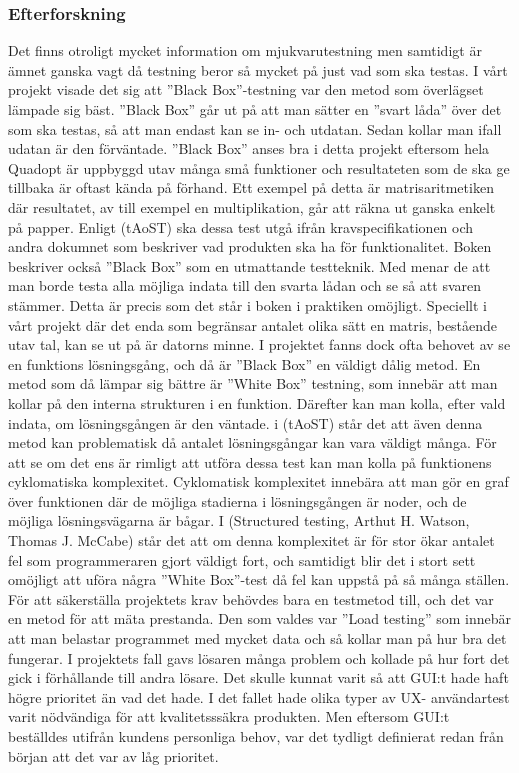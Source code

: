	\subsubsection{Efterforskning}
	Det finns otroligt mycket information om mjukvarutestning men samtidigt är ämnet ganska vagt då testning beror så mycket på just vad som ska testas. I vårt projekt visade det sig att ''Black Box''-testning var den metod som överlägset lämpade sig bäst. ''Black Box'' går ut på att man sätter en ''svart låda'' över det som ska testas, så att man endast kan se in- och utdatan. Sedan kollar man ifall udatan är den förväntade. ''Black Box'' anses bra i detta projekt eftersom hela Quadopt är uppbyggd utav många små funktioner och resultateten som de ska ge tillbaka är oftast kända på förhand. Ett exempel på detta är matrisaritmetiken där resultatet, av till exempel en multiplikation, går att räkna ut ganska enkelt på papper. Enligt (tAoST) ska dessa test utgå ifrån kravspecifikationen och andra dokumnet som beskriver vad produkten ska ha för funktionalitet. Boken beskriver också ''Black Box'' som en utmattande testteknik. Med menar de att man borde testa alla möjliga indata till den svarta lådan och se så att svaren stämmer. Detta är precis som det står i boken i praktiken omöjligt. Speciellt i vårt projekt där det enda som begränsar antalet olika sätt en matris, bestående utav tal, kan se ut på är datorns minne. \newline
	I projektet fanns dock ofta behovet av se en funktions lösningsgång, och då är ''Black Box'' en väldigt dålig metod. En metod som då lämpar sig bättre är ''White Box'' testning, som innebär att man kollar på den interna strukturen i en funktion. Därefter kan man kolla, efter vald indata, om lösningsgången är den väntade. i (tAoST) står det att även denna metod kan problematisk då antalet lösningsgångar kan vara väldigt många. För att se om det ens är rimligt att utföra dessa test kan man kolla på funktionens cyklomatiska komplexitet. Cyklomatisk komplexitet innebära att man gör en graf över funktionen där de möjliga stadierna i lösningsgången är noder, och de möjliga lösningsvägarna är bågar. I (Structured testing, Arthut H. Watson, Thomas J. McCabe) står det att om denna komplexitet är för stor ökar antalet fel som programmeraren gjort väldigt fort, och samtidigt blir det i stort sett omöjligt att uföra några ''White Box''-test då fel kan uppstå på så många ställen. \\
 	
För att säkerställa projektets krav behövdes bara en testmetod till, och det var en metod för att mäta prestanda. Den som valdes var ''Load testing'' som innebär att man belastar programmet med mycket data och så kollar man på hur bra det fungerar. I projektets fall gavs lösaren många problem och kollade på hur fort det gick i förhållande till andra lösare. \newline	
Det skulle kunnat varit så att GUI:t hade haft högre prioritet än vad det hade. I det fallet hade olika typer av UX- användartest varit nödvändiga för att kvalitetsssäkra produkten. Men eftersom GUI:t beställdes utifrån kundens personliga behov, var det tydligt definierat redan från början att det var av låg prioritet. 
	
